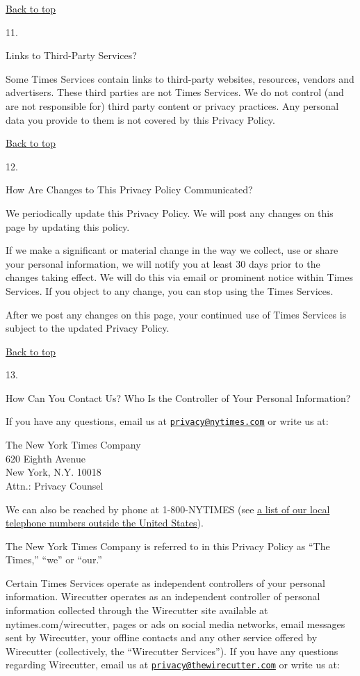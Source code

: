 \href{app}{Back to top}

11.

Links to Third-Party Services?

Some Times Services contain links to third-party websites, resources,
vendors and advertisers. These third parties are not Times Services. We
do not control (and are not responsible for) third party content or
privacy practices. Any personal data you provide to them is not covered
by this Privacy Policy.

\href{app}{Back to top}

12.

How Are Changes to This Privacy Policy Communicated?

We periodically update this Privacy Policy. We will post any changes on
this page by updating this policy.

If we make a significant or material change in the way we collect, use
or share your personal information, we will notify you at least 30 days
prior to the changes taking effect. We will do this via email or
prominent notice within Times Services. If you object to any change, you
can stop using the Times Services.

After we post any changes on this page, your continued use of Times
Services is subject to the updated Privacy Policy.

\href{app}{Back to top}

13.

How Can You Contact Us? Who Is the Controller of Your Personal
Information?

If you have any questions, email us at
\href{mailto:privacy@nytimes.com}{\nolinkurl{privacy@nytimes.com}} or
write us at:

The New York Times Company\\
620 Eighth Avenue\\
New York, N.Y. 10018\\
Attn.: Privacy Counsel

We can also be reached by phone at 1-800-NYTIMES (see
\href{https://subscribe.inyt.com/footer?requestAction=displayContactIht}{a
list of our local telephone numbers outside the United States}).

The New York Times Company is referred to in this Privacy Policy as
``The Times,'' ``we'' or ``our.''

Certain Times Services operate as independent controllers of your
personal information. Wirecutter operates as an independent controller
of personal information collected through the Wirecutter site available
at nytimes.com/wirecutter, pages or ads on social media networks, email
messages sent by Wirecutter, your offline contacts and any other service
offered by Wirecutter (collectively, the ``Wirecutter Services''). If
you have any questions regarding Wirecutter, email us at
\href{mailto:privacy@thewirecutter.com}{\nolinkurl{privacy@thewirecutter.com}}
or write us at:

